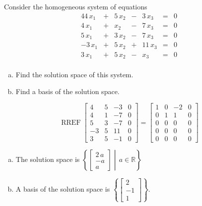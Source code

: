 
\begin{exerciseStatement}


Consider the homogeneous system of equations 
\begin{alignat*}{4} 4 \, x_{1} &+& 5 \, x_{2} &-& 3 \, x_{3} &=& 0 \\4 \, x_{1} &+& x_{2} &-& 7 \, x_{3} &=& 0 \\5 \, x_{1} &+& 3 \, x_{2} &-& 7 \, x_{3} &=& 0 \\-3 \, x_{1} &+& 5 \, x_{2} &+& 11 \, x_{3} &=& 0 \\3 \, x_{1} &+& 5 \, x_{2} &-& x_{3} &=& 0 \\ \end{alignat*}
            


\begin{enumerate}[(a)]
\item  Find the solution space of this system.
\item  Find a basis of the solution space.
\end{enumerate}
    
\end{exerciseStatement}
    
\begin{exerciseAnswer} 


\[\operatorname{RREF} \left[\begin{array}{ccc|c}
4 & 5 & -3 & 0 \\
4 & 1 & -7 & 0 \\
5 & 3 & -7 & 0 \\
-3 & 5 & 11 & 0 \\
3 & 5 & -1 & 0
\end{array}\right] = \left[\begin{array}{ccc|c}
1 & 0 & -2 & 0 \\
0 & 1 & 1 & 0 \\
0 & 0 & 0 & 0 \\
0 & 0 & 0 & 0 \\
0 & 0 & 0 & 0
\end{array}\right] \]


\begin{enumerate}[(a)]
\item The solution space is \( \left\{ \left[\begin{array}{c}
2 \, a \\
-a \\
a
\end{array}\right] \middle|\,a\in\mathbb{R}\right\} \)
\item A basis of the solution space is \( \left\{ \left[\begin{array}{c}
2 \\
-1 \\
1
\end{array}\right] \right\} \).
\end{enumerate}
    
\end{exerciseAnswer}
    
